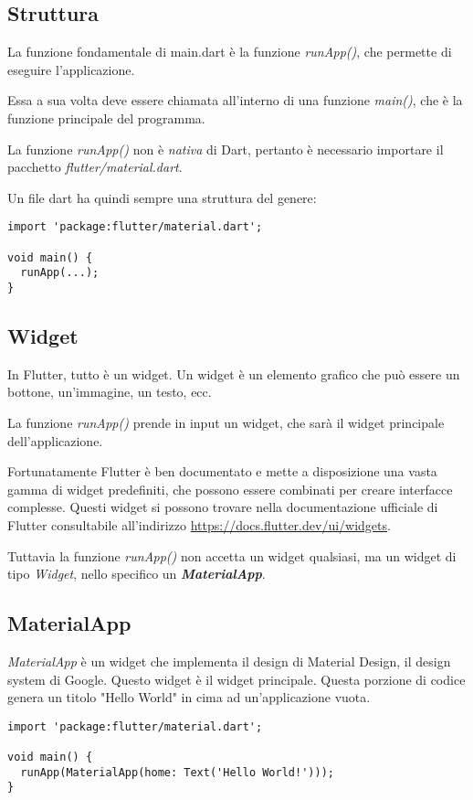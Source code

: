 \documentclass[12pt]{article}
\begin{document}
\subsection{Struttura}
La funzione fondamentale di main.dart è la funzione 
\textit{runApp()}, che permette di eseguire l'applicazione.

Essa a sua volta deve essere chiamata all'interno di una funzione
\textit{main()}, che è la funzione principale del programma.

La funzione \textit{runApp()} non è \textit{nativa} di Dart,
pertanto è necessario importare il pacchetto \textit{flutter/material.dart}.

Un file dart ha quindi sempre una struttura del genere:
\begin{verbatim}
import 'package:flutter/material.dart';

void main() {
  runApp(...);
}
\end{verbatim}

\subsection{Widget}
In Flutter, tutto è un widget. Un widget è un elemento grafico
che può essere un bottone, un'immagine, un testo, ecc.

La funzione \textit{runApp()} prende in input un widget, che sarà
il widget principale dell'applicazione.

Fortunatamente Flutter è ben documentato e mette a disposizione
una vasta gamma di widget predefiniti, che possono essere combinati
per creare interfacce complesse. Questi widget si possono
trovare nella documentazione ufficiale di Flutter consultabile
all'indirizzo \url{https://docs.flutter.dev/ui/widgets}.

Tuttavia la funzione \textit{runApp()} non accetta un widget qualsiasi,
ma un widget di tipo \textit{Widget}, nello specifico un \textit{\textbf{MaterialApp}}.

\subsection{MaterialApp}
\textit{MaterialApp} è un widget che implementa il design di Material Design,
il design system di Google. Questo widget è il widget principale. Questa porzione di codice genera un titolo "Hello World" in cima ad un'applicazione vuota.
\begin{verbatim}
import 'package:flutter/material.dart';

void main() {
  runApp(MaterialApp(home: Text('Hello World!')));
}
\end{verbatim}
\end{document}
